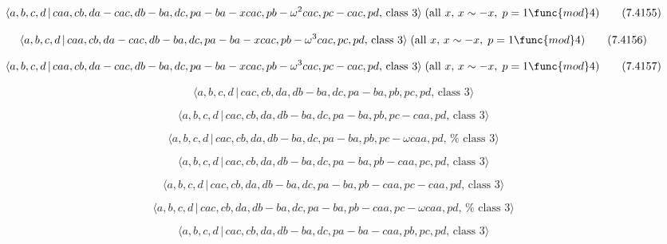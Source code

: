 \documentclass[10pt]{article}
\begin{document}
\begin{equation}
\langle a,b,c,d\,|\,caa,cb,da-cac,db-ba,dc,pa-ba-xcac,pb-\omega
^{2}cac,pc-cac,pd,\,\text{class }3\rangle \;(\text{all }x,\,x\sim -x,\;p=1%
\func{mod}4)  \tag{7.4155}
\end{equation}

\begin{equation}
\langle a,b,c,d\,|\,caa,cb,da-cac,db-ba,dc,pa-ba-xcac,pb-\omega
^{3}cac,pc,pd,\,\text{class }3\rangle \;(\text{all }x,\,x\sim -x,\;p=1\func{%
mod}4)  \tag{7.4156}
\end{equation}

\begin{equation}
\langle a,b,c,d\,|\,caa,cb,da-cac,db-ba,dc,pa-ba-xcac,pb-\omega
^{3}cac,pc-cac,pd,\,\text{class }3\rangle \;(\text{all }x,\,x\sim -x,\;p=1%
\func{mod}4)  \tag{7.4157}
\end{equation}

\begin{equation}
\langle a,b,c,d\,|\,cac,cb,da,db-ba,dc,pa-ba,pb,pc,pd,\,\text{class }3\rangle
\tag{7.4158}
\end{equation}

\begin{equation}
\langle a,b,c,d\,|\,cac,cb,da,db-ba,dc,pa-ba,pb,pc-caa,pd,\,\text{class }%
3\rangle  \tag{7.4159}
\end{equation}

\begin{equation}
\langle a,b,c,d\,|\,cac,cb,da,db-ba,dc,pa-ba,pb,pc-\omega caa,pd,\,\text{%
class }3\rangle  \tag{7.4160}
\end{equation}

\begin{equation}
\langle a,b,c,d\,|\,cac,cb,da,db-ba,dc,pa-ba,pb-caa,pc,pd,\,\text{class }%
3\rangle  \tag{7.4161}
\end{equation}

\begin{equation}
\langle a,b,c,d\,|\,cac,cb,da,db-ba,dc,pa-ba,pb-caa,pc-caa,pd,\,\text{class }%
3\rangle  \tag{7.4162}
\end{equation}

\begin{equation}
\langle a,b,c,d\,|\,cac,cb,da,db-ba,dc,pa-ba,pb-caa,pc-\omega caa,pd,\,\text{%
class }3\rangle  \tag{7.4163}
\end{equation}

\begin{equation}
\langle a,b,c,d\,|\,cac,cb,da,db-ba,dc,pa-ba-caa,pb,pc,pd,\,\text{class }%
3\rangle  \tag{7.4164}
\end{equation}
\end{document}
